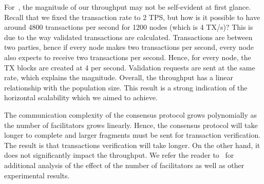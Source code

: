 For~,
the magnitude of our throughput may not be self-evident at first glance.
Recall that we fixed the transaction rate to 2 TPS,
but how is it possible to have around 4800 transactions per second for 1200 nodes (which is 4 TX/s)?
This is due to the way validated transactions are calculated.
Transactions are between two parties, hence if every node makes two transactions per second,
every node also expects to receive two transactions per second.
Hence, for every node, the TX blocks are created at 4 per second.
Validation requests are sent at the same rate, which explains the magnitude.
Overall, the throughput has a linear relationship with the population size.
This result is a strong indication of the horizontal scalability which we aimed to achieve.

The communication complexity of the consensus protocol grows polynomially as the number of facilitators grows linearly.
Hence, the consensus protocol will take longer to complete and larger fragments must be sent for transaction verification.
The result is that transactions verification will take longer.
On the other hand, it does not significantly impact the throughput.
We refer the reader to~\cite[Chapter 5]{checo} for additional analysis of the effect of the number of facilitators as well as other experimental results.

